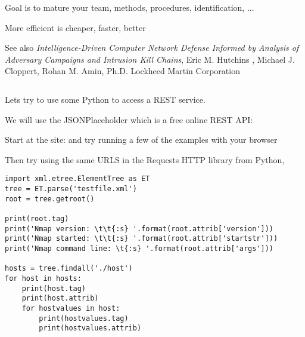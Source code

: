 \documentclass[Screen16to9,17pt]{foils}
\begin{document}
\begin{list2}
\item Goal is to mature your team, methods, procedures, identification, ...
\item More efficient is cheaper, faster, better
\end{list2}



\begin{list2}
\item See also \emph{Intelligence-Driven Computer Network Defense Informed by Analysis of Adversary Campaigns and Intrusion Kill Chains}, Eric M. Hutchins , Michael J. Cloppert, Rohan M. Amin, Ph.D. Lockheed Martin Corporation\\{\footnotesize
 }
\end{list2}






\inputminted{python}{programs/rest-1.py}

\begin{list2}
\item  Lets try to use some Python to access a REST service.
\item  We will use the JSONPlaceholder which is a free online REST API:
\item Start at the site:  and try running a few of the examples with your browser
\item Then try using the same URLS in the Requests HTTP library from Python,\\
\end{list2}



\begin{verbatim}
import xml.etree.ElementTree as ET
tree = ET.parse('testfile.xml')
root = tree.getroot()

print(root.tag)
print('Nmap version: \t\t{:s} '.format(root.attrib['version']))
print('Nmap started: \t\t{:s} '.format(root.attrib['startstr']))
print('Nmap command line: \t{:s} '.format(root.attrib['args']))

hosts = tree.findall('./host')
for host in hosts:
    print(host.tag)
    print(host.attrib)
    for hostvalues in host:
        print(hostvalues.tag)
        print(hostvalues.attrib)
\end{verbatim}
\end{document}
